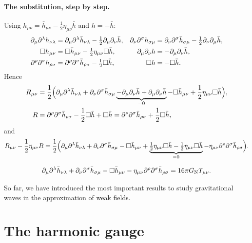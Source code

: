 \paragraph{The substitution, step by step.} Using $h_{\mu\nu}=\bar h_{\mu\nu}-\frac12\eta_{\mu\nu}\bar h$ and $h=-\bar h$:
\begin{align*}
  \partial_\mu\partial^\lambda h_{\nu\lambda}&=\partial_\mu\partial^\lambda\bar h_{\nu\lambda}-\tfrac12\partial_\mu\partial_\nu\bar h, &
  \partial_\nu\partial^\sigma h_{\sigma\mu}&=\partial_\nu\partial^\sigma\bar h_{\sigma\mu}-\tfrac12\partial_\nu\partial_\mu\bar h,\\
  \square h_{\mu\nu}&=\square\bar h_{\mu\nu}-\tfrac12\eta_{\mu\nu}\square\bar h, &
  \partial_\mu\partial_\nu h&=-\partial_\mu\partial_\nu\bar h,\\
  \partial^\rho\partial^\sigma h_{\rho\sigma}&=\partial^\rho\partial^\sigma\bar h_{\rho\sigma}-\tfrac12\square\bar h, &
  \square h&=-\square\bar h .
\end{align*}
Hence
\begin{align*}
  R_{\mu\nu}&=\frac12\Big(\partial_\mu\partial^\lambda\bar h_{\nu\lambda}+\partial_\nu\partial^\sigma\bar h_{\sigma\mu}\underbrace{-\partial_\mu\partial_\nu\bar h+\partial_\mu\partial_\nu\bar h}_{=0}-\square\bar h_{\mu\nu}+\frac12\eta_{\mu\nu}\square\bar h\Big),\\
  R&=\partial^\rho\partial^\sigma\bar h_{\rho\sigma}-\frac12\square\bar h+\square\bar h=\partial^\rho\partial^\sigma\bar h_{\rho\sigma}+\frac12\square\bar h ,
\end{align*}
and
\[
  R_{\mu\nu}-\frac12\eta_{\mu\nu}R=\frac12\Big(\partial_\mu\partial^\lambda\bar h_{\nu\lambda}+\partial_\nu\partial^\sigma\bar h_{\sigma\mu}-\square\bar h_{\mu\nu}+\underbrace{\tfrac12\eta_{\mu\nu}\square\bar h-\tfrac12\eta_{\mu\nu}\square\bar h}_{=0}-\eta_{\mu\nu}\partial^\rho\partial^\sigma\bar h_{\rho\sigma}\Big).
\]
\begin{keyresult}
\begin{equation}
  \partial_\mu\partial^\lambda\bar h_{\nu\lambda}+\partial_\nu\partial^\sigma\bar h_{\sigma\mu}-\square\bar h_{\mu\nu}-\eta_{\mu\nu}\partial^\rho\partial^\sigma\bar h_{\rho\sigma}=16\pi G_{\mathrm N} T_{\mu\nu}.
  \label{eq:lin-efe}
\end{equation}
\end{keyresult}
So far, we have introduced the most important results to study gravitational waves in the approximation of weak fields.

\section{The harmonic gauge}

